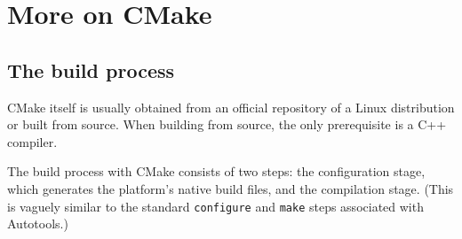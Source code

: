 \chapter{More on CMake}
\label{Sec:cmake}

\section{\label{sec:CMake_build_process}The build process}

CMake itself is usually obtained from an official repository of a Linux distribution or built from source. When building from source, the only prerequisite is a C++ compiler.

The build process with CMake consists of two steps: the configuration stage, which generates the platform's native build files, and the compilation stage. (This is vaguely similar to the standard \texttt{configure} and \texttt{make} steps associated with Autotools.)

